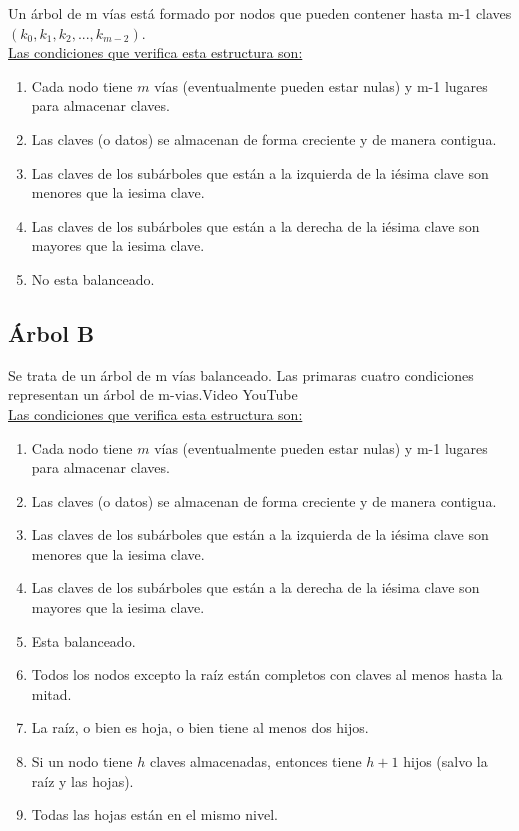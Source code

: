 \documentclass[../main.tex]{subfiles}
\begin{document}
        Un árbol de m vías está formado por nodos que pueden contener hasta m-1 claves $(k_0, k_1,k_2, ... , k_{m-2})$.\\

        \underline{Las condiciones que verifica esta estructura son:}
        \begin{enumerate}
            \item Cada nodo tiene $m$ vías (eventualmente pueden estar nulas) y m-1 lugares para almacenar claves.
            \item Las claves (o datos) se almacenan de forma creciente y de manera contigua.
            \item Las claves de los subárboles que están a la izquierda de la iésima clave son menores que la iesima clave.
            \item Las claves de los subárboles que están a la derecha de la iésima clave son mayores que la iesima clave.
            \item No esta balanceado.
        \end{enumerate}

    \subsection{Árbol B}
        Se trata de un árbol de m vías balanceado. Las primaras cuatro condiciones representan un árbol de m-vias.Video YouTube \cite{Árboles-B_youtube}\\

        \underline{Las condiciones que verifica esta estructura son:}
        \begin{enumerate}
            \item Cada nodo tiene $m$ vías (eventualmente pueden estar nulas) y m-1 lugares para almacenar claves.
            \item Las claves (o datos) se almacenan de forma creciente y de manera contigua.
            \item Las claves de los subárboles que están a la izquierda de la iésima clave son menores que la iesima clave.
            \item Las claves de los subárboles que están a la derecha de la iésima clave son mayores que la iesima clave.
            \item Esta balanceado.
            \item Todos los nodos excepto la raíz están completos con claves al menos hasta la mitad.
            \item La raíz, o bien es hoja, o bien tiene al menos dos hijos.
            \item Si un nodo tiene $h$ claves almacenadas, entonces tiene $h+1$ hijos (salvo la raíz y las hojas).
            \item Todas las hojas están en el mismo nivel.
        \end{enumerate}
\end{document}
